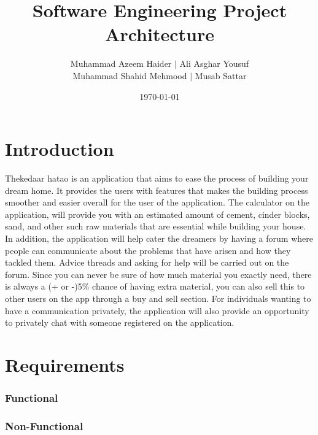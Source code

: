 \documentclass{article}
\title{Software Engineering Project Architecture}
\author{Muhammad Azeem Haider $\mid$ Ali Asghar Yousuf \\
    Muhammad Shahid Mehmood $\mid$ Musab Sattar}
\date{\today}
\begin{document}
\maketitle

\section*{Introduction}

Thekedaar hatao is an application that aims to ease the process of building your dream home. It provides the users with features that makes the building process smoother and easier overall for the user of the application. 
The calculator on the application, will provide you with an estimated amount of cement, cinder blocks, sand, and other such raw materials that are essential while building your house.
In addition, the application will help cater the dreamers by having a forum where people can communicate about the problems that have arisen and how they tackled them.
Advice threads and asking for help will be carried out on the forum. Since you can never be sure of how much material you exactly need, there is always a (+ or -)5\%
chance of having extra material, you can also sell this to other users on the app through a buy and sell section. For individuals wanting to have a communication privately, the application will also provide an opportunity to privately chat with someone registered on the application. 


\section*{Requirements}

\subsubsection*{Functional}



\subsubsection*{Non-Functional}
\end{document}
